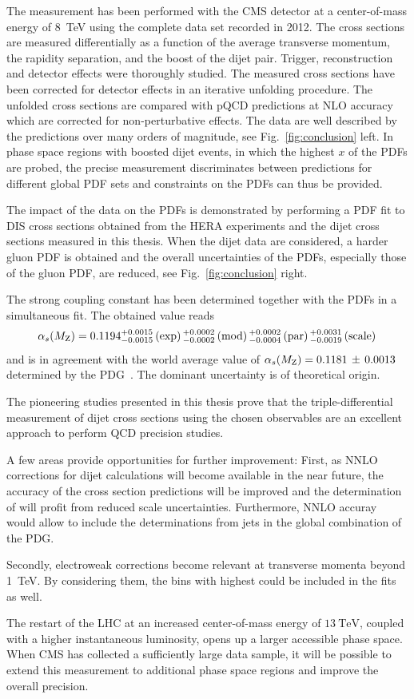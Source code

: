 The measurement has been performed with the CMS detector at a center-of-mass
energy of \SI{8}{\TeV} using the complete data set recorded in 2012. The cross
sections are measured differentially as a function of the average transverse
momentum, the rapidity separation, and the boost of the dijet pair. Trigger,
reconstruction and detector effects were thoroughly studied. The measured cross
sections have been corrected for detector effects in an iterative unfolding
procedure. The unfolded cross sections are compared with pQCD predictions at NLO
accuracy which are corrected for non-perturbative effects. The data are well
described by the predictions over many orders of magnitude, see
Fig.~\ref{fig:conclusion} left. In phase space regions with boosted dijet
events, in which the highest $x$ of the PDFs are probed, the precise measurement
discriminates between predictions for different global PDF sets and constraints
on the PDFs can thus be provided. 

The impact of the data on the PDFs is demonstrated by performing a PDF fit to
DIS cross sections obtained from the HERA experiments and the dijet cross sections measured
in this thesis. When the dijet data are considered, a harder gluon PDF is obtained
and the overall uncertainties of the PDFs, especially those of the gluon PDF,
are reduced, see Fig.~\ref{fig:conclusion} right.

The strong coupling constant \asmz has been determined together with the PDFs in
a simultaneous fit. The obtained value reads
%
\begin{equation*}
    \alpha_{s}(M_\mathrm{Z}) = 0.1194_{-0.0015}^{+0.0015}\,(\mathrm{exp})\,
    {}_{-0.0002}^{+0.0002}\,(\mathrm{mod})\,{}_{-0.0004}^{+0.0002}\,(\mathrm{par})\,
    {}_{-0.0019}^{+0.0031}\,(\mathrm{scale})\,
\end{equation*}
%
and is in agreement with the world average value of $\alpha_{s}(M_\mathrm{Z}) = 0.1181 \,\pm\, 0.0013$
determined by the PDG~\cite{Agashe:2014kda}. The dominant uncertainty is of
theoretical origin.

The pioneering studies presented in this thesis prove that the triple-differential
measurement of dijet cross sections using the chosen observables are an
excellent approach to perform QCD precision studies.

A few areas provide opportunities for further improvement: First, as NNLO
corrections for dijet calculations will become available in the near future, the
accuracy of the cross section predictions will be improved and the determination
of \asmz will profit from reduced scale uncertainties. Furthermore, NNLO accuray
would allow to include the \as determinations from jets in the global
combination of the PDG.

Secondly, electroweak corrections become relevant at transverse momenta beyond
\SI{1}{\TeV}. By considering them, the bins with highest \ptavg could be
included in the fits as well.

The restart of the LHC at an increased center-of-mass energy of $\SI{13}{\TeV}$,
coupled with a higher instantaneous luminosity, opens up a larger
accessible phase space. When CMS has collected a sufficiently large data sample,
it will be possible to extend this measurement to additional phase space regions
and improve the overall precision.

